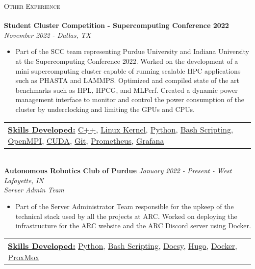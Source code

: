 \documentclass[a4paper]{article}
\newcommand{\lineunder} {
    \vspace*{-8pt} \\
    \hspace*{-18pt} \hrulefill \\
}
\newcommand{\header} [1] {
    {\hspace*{-18pt}\vspace*{6pt} \textsc{#1}}
    \vspace*{-6pt} \lineunder
}
\begin{document}
\header{Other Experience}
\textbf{Student Cluster Competition - Supercomputing Conference 2022} \hfill \textit {November 2022 - Dallas, TX}\\
\vspace{-2mm}
\begin{itemize}
    \item Part of the SCC team representing Purdue University and Indiana University at the Supercomputing Conference 2022. 
    Worked on the development of a mini supercomputing cluster capable of running scalable HPC applications such as PHASTA and LAMMPS. 
    Optimized and compiled state of the art benchmarks such as HPL, HPCG, and MLPerf. Created a dynamic power management interface to monitor and control the power consumption of the cluster by underclocking and limiting the GPUs and CPUs.\\
\end{itemize}
\vspace{-1mm}
\begin{tabular}{ l l }
    \underline{\textbf {Skills Developed:}} \href{https://www.cplusplus.com/}{C++}, \href{https://www.kernel.org/}{Linux Kernel}, \href{https://www.python.org/}{Python}, \href{https://www.gnu.org/software/bash/}{Bash Scripting}, \href{https://www.open-mpi.org/}{OpenMPI}, \href{https://developer.nvidia.com/cuda-zone}{CUDA}, \href{https://git-scm.com/}{Git}, \href{https://prometheus.io/}{Prometheus}, \href{https://grafana.com/}{Grafana}
\end{tabular}\\
\vspace{2mm}
{\textbf{Autonomous Robotics Club of Purdue}} \hfill \textit {January 2022 - Present - West Lafayette, IN}\\
\textit{Server Admin Team}
\begin{itemize} \itemsep 1pt
    \item Part of the Server Administrator Team responsible for the upkeep of the technical stack used by all the projects at ARC.
    Worked on deploying the infrastructure for the ARC website and the ARC Discord server using Docker.
\end{itemize}
\begin{tabular}{ l l }
    \underline{\textbf {Skills Developed:}} \href{https://www.python.org/}{Python}, \href{https://www.gnu.org/software/bash/}{Bash Scripting}, \href{https://www.docsy.dev/}{Docsy}, \href{https://gohugo.io/about/what-is-hugo/}{Hugo}, \href{https://www.docker.com/}{Docker}, \href{https://www.proxmox.com/en/}{ProxMox}
\end{tabular} \\
\end{document}
